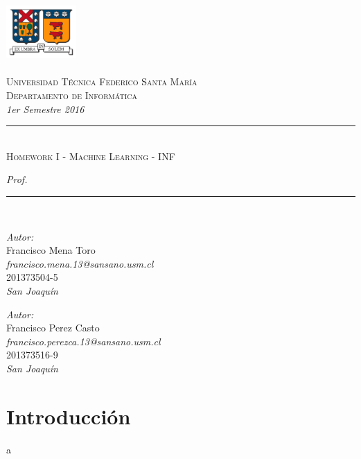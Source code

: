 \documentclass[10pt]{article}
\newcommand{\HRule}{\rule{\linewidth}{0.25mm}}
\begin{document}
\begin{center}
\includegraphics[width=0.2\textwidth]{images/logo_usm}~\\[1.2cm]
~\\[-1.5cm]

\textsc{\large Universidad T\'ecnica Federico Santa Mar\'ia}\\[0.2cm]
\textsc{\large Departamento de Inform\'atica}\\[0.2cm]
\textit{1er Semestre 2016}\\[4cm]

\HRule \\[0.6cm]
{\Large \textsc{Homework I - Machine Learning - INF}}\\[0.4cm]
{\Large \textit{Prof. }\\[0.1cm]
\HRule \\[0.8cm]

\begin{minipage}{0.4\textwidth}
\begin{center}
\emph{Autor:}\\
Francisco Mena Toro\\ \textit{francisco.mena.13@sansano.usm.cl} \\ 201373504-5 \\
\emph{San Joaqu\'in}
\end{center}
\end{minipage}
\begin{minipage}{0.4\textwidth}
\begin{center}
\emph{Autor:}\\
Francisco Perez Casto\\ \textit{francisco.perezca.13@sansano.usm.cl} \\ 201373516-9 \\
\emph{San Joaqu\'in}
\end{center}
\end{minipage}
}\end{center}

\vspace{2cm}

\newpage


\section{Introducción}
a\\
\end{document}
